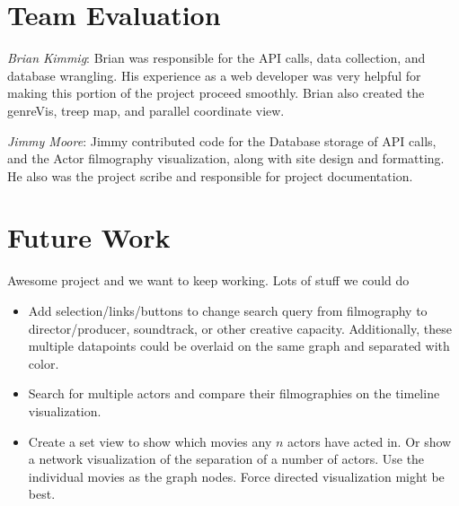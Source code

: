 \documentclass[12pt]{article}
\begin{document}
\newpage

\section{Team Evaluation}

\textit{Brian Kimmig}: Brian was responsible for the API calls, data collection, and database wrangling. His experience as a web developer was very helpful for making this portion of the project proceed smoothly. Brian also created  the genreVis, treep map, and parallel coordinate view.

\textit{Jimmy Moore}: Jimmy contributed code for the Database storage of API calls, and the Actor filmography visualization, along with site design and formatting.  He also was the project scribe and responsible for project documentation.

\newpage

\section{Future Work}


Awesome project and we want to keep working.  Lots of stuff we could do

\begin{itemize}
	\item Add selection/links/buttons to change search query from filmography to director/producer, soundtrack, or other creative capacity.  Additionally, these multiple datapoints could be overlaid on the same graph and separated with color.
	\item Search for multiple actors and compare their filmographies on the timeline visualization.
	\item Create a set view to show which movies any $n$ actors have acted in.  Or show a network visualization of the separation of a number of actors.  Use the individual movies as the graph nodes.  Force directed visualization might be best.
\end{itemize}
\end{document}
